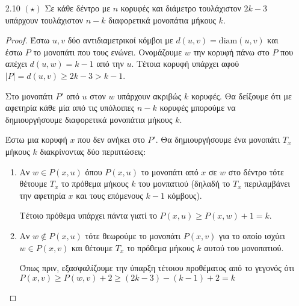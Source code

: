 \documentclass[a4paper, oneside, 11pt]{article}
\theoremstyle{definition}
\begin{document}
\begin{enumerate}
   \item[2.10 $(\star)$]
      Σε κάθε δέντρο με $n$ κορυφές και διάμετρο τουλάχιστον
      $2k - 3$ υπάρχουν τουλάχιστον $n-k$ διαφορετικά μονοπάτια
      μήκους $k$.

      \begin{proof}

      Έστω $u, v$ δύο αντιδιαμετρικοί κόμβοι με $d(u, v) = \text{diam}(u, v)$
      και έστω $P$ το μονοπάτι που τους ενώνει.
      Ονομάζουμε $w$ την κορυφή πάνω στο $P$ που απέχει $d(u, w) = k-1$
      από την $u$. Τέτοια κορυφή υπάρχει αφού $|P| = d(u, v) \geq 2k-3 > k-1$.


      
      Στο μονοπάτι $P'$ από $u$ στον $w$ υπάρχουν ακριβώς $k$ κορυφές.
      Θα δείξουμε ότι με αφετηρία κάθε μία από τις υπόλοιπες $n-k$ κορυφές
      μπορούμε να δημιουργήσουμε διαφορετικά μονοπάτια μήκους $k$.

      Έστω μια κορυφή $x$ που δεν ανήκει στο $P'$. Θα δημιουργήσουμε ένα
      μονοπάτι $T_x$ μήκους $k$ διακρίνοντας δύο περιπτώσεις:

      \begin{enumerate}
         \item Αν $w \in P(x, u)$ όπου $P(x, u)$ το μονοπάτι από $x$ σε
               $w$ στο δέντρο τότε θέτουμε $T_x$ το πρόθεμα μήκους $k$ του
               μονπατιού (δηλαδή το $T_x$ περιλαμβάνει την αφετηρία $x$ και
               τους επόμενους $k-1$ κόμβους).

               Τέτοιο πρόθεμα υπάρχει πάντα γιατί το $P(x, u) \geq
               P(x, w) + 1 = k$.

         \item Αν $w \notin P(x, u)$ τότε θεωρούμε το μονοπάτι $P(x, v)$
               για το οποίο ισχύει $w \in P(x, v)$ και θέτουμε $T_x$ το
               πρόθεμα μήκους $k$ αυτού του μονοπατιού.

               Όπως πριν, εξασφαλίζουμε την ύπαρξη τέτοιου προθέματος
               από το γεγονός ότι $P(x, v) \geq P(w, v) + 2 \geq
               (2k-3) - (k-1) + 2 = k$
      \end{enumerate}


\end{proof}
\end{enumerate}
\end{document}
